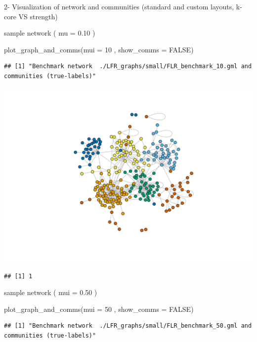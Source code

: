 \documentclass[
  ignorenonframetext,
]{beamer}
\newenvironment{Shaded}{\begin{snugshade}}{\end{snugshade}}
\newcommand{\AttributeTok}[1]{\textcolor[rgb]{0.77,0.63,0.00}{#1}}
\newcommand{\ConstantTok}[1]{\textcolor[rgb]{0.00,0.00,0.00}{#1}}
\newcommand{\DecValTok}[1]{\textcolor[rgb]{0.00,0.00,0.81}{#1}}
\newcommand{\FunctionTok}[1]{\textcolor[rgb]{0.00,0.00,0.00}{#1}}
\newcommand{\NormalTok}[1]{#1}
\begin{document}
\begin{frame}[fragile]{2- Visualization of network and communities
(standard and custom layouts, k-core VS strength)}
\begin{block}{sample network ( mu = 0.10 )}
\protect\hypertarget{sample-network-mu-0.10}{}
\begin{Shaded}
\begin{Highlighting}[]
\FunctionTok{plot\_graph\_and\_comms}\NormalTok{(}\AttributeTok{mui =} \DecValTok{10}\NormalTok{ , }\AttributeTok{show\_comms =} \ConstantTok{FALSE}\NormalTok{) }
\end{Highlighting}
\end{Shaded}

\begin{verbatim}
## [1] "Benchmark network  ./LFR_graphs/small/FLR_benchmark_10.gml and communities (true-labels)"
\end{verbatim}

\includegraphics{presentation1_files/figure-beamer/unnamed-chunk-9-1.pdf}

\begin{verbatim}
## [1] 1
\end{verbatim}
\end{block}

\begin{block}{sample network ( mui = 0.50 )}
\protect\hypertarget{sample-network-mui-0.50}{}
\begin{Shaded}
\begin{Highlighting}[]
\FunctionTok{plot\_graph\_and\_comms}\NormalTok{(}\AttributeTok{mui =} \DecValTok{50}\NormalTok{ , }\AttributeTok{show\_comms =} \ConstantTok{FALSE}\NormalTok{) }
\end{Highlighting}
\end{Shaded}

\begin{verbatim}
## [1] "Benchmark network  ./LFR_graphs/small/FLR_benchmark_50.gml and communities (true-labels)"
\end{verbatim}


\end{block}
\end{frame}
\end{document}
